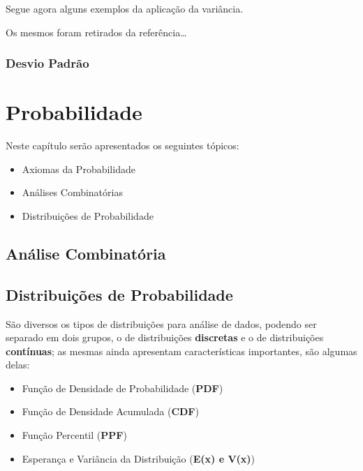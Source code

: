 \documentclass[
]{book}
\providecommand{\tightlist}{%
  \setlength{\itemsep}{0pt}\setlength{\parskip}{0pt}}
\begin{document}
Segue agora alguns exemplos da aplicação da variância.

Os mesmos foram retirados da referência\ldots{}

\hypertarget{desvio-padruxe3o}{%
\subsection{Desvio Padrão}\label{desvio-padruxe3o}}

\hypertarget{probabilidade}{%
\chapter{Probabilidade}\label{probabilidade}}

Neste capítulo serão apresentados os seguintes tópicos:

\begin{itemize}
\tightlist
\item
  Axiomas da Probabilidade
\item
  Análises Combinatórias
\item
  Distribuições de Probabilidade
\end{itemize}

\hypertarget{anuxe1lise-combinatuxf3ria}{%
\section{Análise Combinatória}\label{anuxe1lise-combinatuxf3ria}}

\hypertarget{distribuiuxe7uxf5es-de-probabilidade}{%
\section{Distribuições de Probabilidade}\label{distribuiuxe7uxf5es-de-probabilidade}}

São diversos os tipos de distribuições para análise de dados, podendo ser separado em dois grupos, o de distribuições \textbf{discretas} e o de distribuições \textbf{contínuas}; as mesmas ainda apresentam características importantes, são algumas delas:

\begin{itemize}
\tightlist
\item
  Função de Densidade de Probabilidade (\textbf{PDF})
\item
  Função de Densidade Acumulada (\textbf{CDF})
\item
  Função Percentil (\textbf{PPF})
\item
  Esperança e Variância da Distribuição (\textbf{E(x) e V(x)})
\end{itemize}
\end{document}
